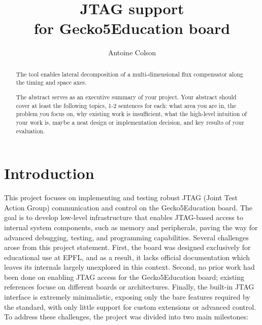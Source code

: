 \documentclass[a4paper,11pt,oneside]{report}
\title{JTAG support \\for Gecko5Education board}
\author{Antoine Colson}
\newcommand{\boardName}{Gecko5Education \xspace}
\begin{document}
\maketitle

\begin{abstract}
The \sysname tool enables lateral decomposition of a multi-dimensional
flux compensator along the timing and space axes.

The abstract serves as an executive summary of your project.
Your abstract should cover at least the following topics, 1-2 sentences for
each: what area you are in, the problem you focus on, why existing work is
insufficient, what the high-level intuition of your work is, maybe a neat
design or implementation decision, and key results of your evaluation.
\end{abstract}


\maketoc

\chapter{Introduction}

    This project focuses on implementing and testing robust JTAG (Joint Test Action Group) communication 
and control on the \boardName board. The goal is to develop 
low-level infrastructure that enables JTAG-based access to internal system components, 
such as memory and peripherals, paving the way for advanced debugging, testing, and programming capabilities.
Several challenges arose from this project statement.
First, the board was designed exclusively for educational use at EPFL, and as a result, it lacks official documentation which leaves its internals largely unexplored in this context. 
Second, no prior work had been done on enabling JTAG access for the \boardName board; existing references focuse on different boards or architectures. 
Finally, the built-in JTAG interface is extremely minimalistic, exposing only the bare features required by the standard, with only little support for custom extensions or advanced control.\\

To address these challenges, the project was divided into two main milestones: 
\end{document}
